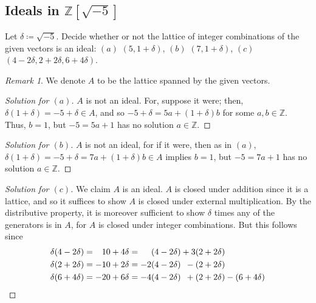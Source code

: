 \documentclass[12pt]{article}
\theoremstyle{remark}
\newtheorem*{remark}{Remark}
\begin{document}
\subsection{Ideals in \texorpdfstring{$\mathbb{Z}[\sqrt{-5}]$}{Z[√-5]}}
\setcounter{subsubsection}{1}
\begin{problem}
  Let $\delta \coloneqq \sqrt{-5}$. Decide whether or not the lattice of integer combinations of the given vectors is an ideal: $(a)$ $(5,1 +\delta)$, $(b)$ $(7,1+\delta)$, $(c)$ $(4 - 2 \delta,2 + 2 \delta,6 + 4 \delta)$.
\end{problem}
\begin{remark}
  We denote $A$ to be the lattice spanned by the given vectors.
\end{remark}
\begin{proof}[Solution for $(a)$]
  $A$ is not an ideal. For, suppose it were; then, $\delta(1+\delta) = -5 + \delta \in A$, and so $-5 + \delta = 5a+(1+\delta)b$ for some $a,b \in \mathbb{Z}$. Thus, $b=1$, but $-5 = 5a + 1$ has no solution $a\in\mathbb{Z}$.
\end{proof}
\begin{proof}[Solution for $(b)$]
  $A$ is not an ideal, for if it were, then as in $(a)$, $\delta(1+\delta) = -5 + \delta = 7a + (1+\delta)b \in A$ implies $b=1$, but $-5 = 7a + 1$ has no solution $a\in\mathbb{Z}$.
\end{proof}
\begin{proof}[Solution for $(c)$]
  We claim $A$ is an ideal. $A$ is closed under addition since it is a lattice, and so it suffices to show $A$ is closed under external multiplication. By the distributive property, it is moreover sufficient to show $\delta$ times any of the generators is in $A$, for $A$ is closed under integer combinations. But this follows since
  \begin{equation*}
    \begin{alignedat}{8}
      \delta (4 - 2 \delta) &={}&  10 &+{}& 4 \delta &={}& (4 - 2 \delta) &&{}+ 3 (2 + 2 \delta)\\
      \delta (2 + 2 \delta) &={}& -10 &+{}& 2 \delta &={}& -2 (4 - 2 \delta) &&{}- (2 + 2 \delta)\\
      \delta (6 + 4 \delta) &={}& -20 &+{}& 6 \delta &={}& -4 (4 - 2 \delta) &&{}+ (2 + 2 \delta) &-{}& (6 + 4 \delta)
    \end{alignedat}\qedhere
  \end{equation*}
\end{proof}
\end{document}
